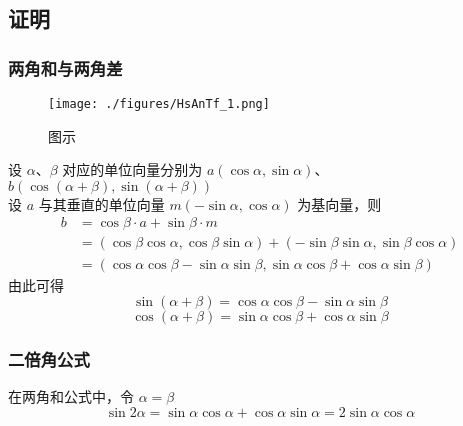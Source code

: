 \subsection{证明}
\subsubsection{两角和与两角差}
\begin{figure}[ht]
\centering
\texttt{[image: ./figures/HsAnTf\_1.png]}
\caption{图示} \label{HsAnTf_fig1}
\end{figure}
设 $\alpha$、$\beta$ 对应的单位向量分别为 $a(\cos\alpha,\sin\alpha)$、$b(\cos(\alpha+\beta),\sin(\alpha+\beta))$\\
设 $a$ 与其垂直的单位向量 $m(-\sin\alpha,\cos\alpha)$ 为基向量，则
\begin{equation}
\begin{aligned}
b &= \cos\beta \cdot a + \sin\beta \cdot m \\
&= (\cos\beta \cos\alpha,\cos\beta \sin\alpha) + (-\sin\beta \sin\alpha,\sin\beta \cos\alpha) \\
&= (\cos\alpha \cos\beta-\sin\alpha \sin\beta,\sin\alpha \cos\beta + \cos\alpha \sin\beta)
\end{aligned}
\end{equation}
由此可得
\begin{equation}
\sin(\alpha+\beta) = \cos\alpha \cos\beta-\sin\alpha \sin\beta
\end{equation}
\begin{equation}
\cos(\alpha+\beta) = \sin\alpha \cos\beta + \cos\alpha \sin\beta
\end{equation}
\subsubsection{二倍角公式}
在两角和公式中，令 $\alpha = \beta$
\begin{equation}
\sin2\alpha = \sin\alpha\cos\alpha+\cos\alpha\sin\alpha = 2\sin\alpha\cos\alpha
\end{equation}